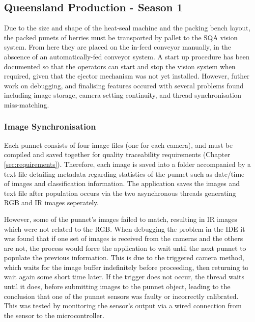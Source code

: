\documentclass[fleqn,twoside]{article}
\begin{document}
\subsection{Queensland Production - Season 1}

Due to the size and shape of the heat-seal machine and the packing bench layout, the packed punets of berries must be transported by pallet to the SQA vision system. From here they are placed on the in-feed conveyor manually, in the abscence of an automatically-fed conveyor system. A start up procedure has been documented so that the operators can start and stop the vision system when required, given that the ejector mechanism was not yet installed. However, futher work on debugging, and finalising features occured with several problems found including image storage, camera setting continuity, and thread synchronisation miss-matching. 



\subsubsection{Image Synchronisation}

Each punnet consists of four image files (one for each camera), and must be compiled and saved together for quality traceability requirements (Chapter \ref{sec:requirements}). Therefore, each image is saved into a folder accompanied by a text file detailing metadata regarding statistics of the punnet such as date/time of images and classification information. The application saves the images and text file after population occurs via the two asynchronous threads generating RGB and IR images seperately. 

However, some of the punnet's images failed to match, resulting in IR images which were not related to the RGB. When debugging the problem in the IDE it was found that if one set of images is received from the cameras and the others are not, the process would force the application to wait until the next punnet to populate the previous information. This is due to the triggered camera method, which waits for the image buffer indefinitely before proceeding, then returning to wait again some short time later. If the trigger does not occur, the thread waits until it does, before submitting images to the punnet object, leading to the conclusion that one of the punnet sensors was faulty or incorrectly calibrated. This was tested by monitoring the sensor's output via a wired connection from the sensor to the microcontroller. 
\end{document}
